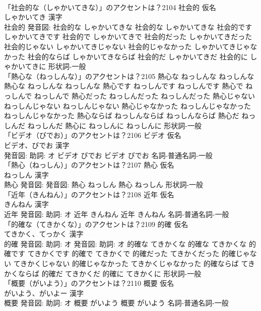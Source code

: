 \documentclass[8pt]{extreport}
\begin{document}
\begin{CJK}{UTF8}{min}
\\	「社会的な（しゃかいてきな）」のアクセントは？2104	社会的 仮名　
\\	しゃかいてき 漢字　
\\	社会的 発音図:	社会的な しゃかいてきな		社会的な しゃかいてきな 社会的です しゃかいてきです 社会的で しゃかいてきで 社会的だった しゃかいてきだった 社会的じゃない しゃかいてきじゃない 社会的じゃなかった しゃかいてきじゃなかった 社会的ならば しゃかいてきならば 社会的だ しゃかいてきだ 社会的に しゃかいてきに				形状詞-一般 
\\	「熱心な（ねっしんな）」のアクセントは？2105		熱心な ねっしんな ねっしんな		熱心な ねっしんな ねっしんな 熱心です ねっしんです ねっしんです 熱心で ねっしんで ねっしんで 熱心だった ねっしんだった ねっしんだった 熱心じゃない ねっしんじゃない ねっしんじゃない 熱心じゃなかった ねっしんじゃなかった ねっしんじゃなかった 熱心ならば ねっしんならば ねっしんならば 熱心だ ねっしんだ ねっしんだ 熱心に ねっしんに ねっしんに				形状詞-一般 
\\	「ビデオ（びでお）」のアクセントは？2106	ビデオ 仮名　
\\	ビデオ、びでお 漢字　
\\	発音図: 助詞: オ	ビデオ びでお		ビデオ びでお				名詞-普通名詞-一般 
\\	「熱心（ねっしん）」のアクセントは？2107	熱心 仮名　
\\	ねっしん 漢字　
\\	熱心 発音図: 発音図:	熱心 ねっしん		熱心 ねっしん				形状詞-一般 
\\	「近年（きんねん）」のアクセントは？2108	近年 仮名　
\\	きんねん 漢字　
\\	近年 発音図: 助詞: オ	近年 きんねん		近年 きんねん				名詞-普通名詞-一般 
\\	「的確な（てきかくな）」のアクセントは？2109	的確 仮名　
\\	てきかく、てっかく 漢字　
\\	的確 発音図: 助詞: オ 発音図: 助詞: オ	的確な てきかくな		的確な てきかくな 的確です てきかくです 的確で てきかくで 的確だった てきかくだった 的確じゃない てきかくじゃない 的確じゃなかった てきかくじゃなかった 的確ならば てきかくならば 的確だ てきかくだ 的確に てきかくに				形状詞-一般 
\\	「概要（がいよう）」のアクセントは？2110	概要 仮名　
\\	がいよう、がいよー 漢字　
\\	概要 発音図: 助詞: オ	概要 がいよう		概要 がいよう				名詞-普通名詞-一般 

\end{CJK}
\end{document}
